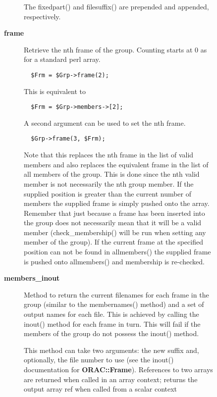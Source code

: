 \begin{description}
\begin{description}
\begin{description}
The fixedpart() and filesuffix() are prepended and appended,
respectively.


\item[{\textbf{frame}}] \mbox{}

Retrieve the nth frame of the group.
Counting starts at 0 as for a standard perl array.

\begin{verbatim}
  $Frm = $Grp->frame(2);
\end{verbatim}


This is equivalent to

\begin{verbatim}
  $Frm = $Grp->members->[2];
\end{verbatim}


A second argument can be used to set the nth frame.

\begin{verbatim}
  $Grp->frame(3, $Frm);
\end{verbatim}


Note that this replaces the nth frame in the list of valid members and
also replaces the equivalent frame in the list of all members of the
group. This is done since the nth valid member is not necessarily the
nth group member. If the supplied position is greater than the current
number of members the supplied frame is simply pushed onto the
array. Remember that just because a frame has been inserted into the
group does not necessarily mean that it will be a valid member
(check\_membership() will be run when setting any member of the group).
If the current frame at the specified position can not be found in
allmembers() the supplied frame is pushed onto allmembers() and
membership is re-checked.


\item[{\textbf{members\_inout}}] \mbox{}

Method to return the current filenames for each frame in the
group (similar to the membernames() method) and a set of output
names for each file. This is achieved by calling the inout()
method for each frame in turn. This will fail if the members of the
group do not possess the inout() method.



This method can take two arguments: the new suffix and, optionally,
the file number to use (see the inout() documentation for
\textbf{ORAC::Frame}). References to two arrays are returned when called
in an array context; returns the output array ref when called
from a scalar context


\end{description}
\end{description}
\end{description}
